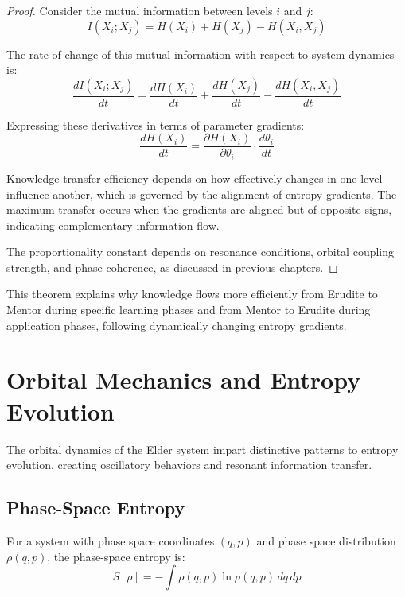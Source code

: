 \begin{proof}
Consider the mutual information between levels $i$ and $j$:
\begin{equation}
I(X_i; X_j) = H(X_i) + H(X_j) - H(X_i, X_j)
\end{equation}

The rate of change of this mutual information with respect to system dynamics is:
\begin{equation}
\frac{dI(X_i; X_j)}{dt} = \frac{dH(X_i)}{dt} + \frac{dH(X_j)}{dt} - \frac{dH(X_i, X_j)}{dt}
\end{equation}

Expressing these derivatives in terms of parameter gradients:
\begin{equation}
\frac{dH(X_i)}{dt} = \frac{\partial H(X_i)}{\partial \theta_i} \cdot \frac{d\theta_i}{dt}
\end{equation}

Knowledge transfer efficiency depends on how effectively changes in one level influence another, which is governed by the alignment of entropy gradients. The maximum transfer occurs when the gradients are aligned but of opposite signs, indicating complementary information flow.

The proportionality constant depends on resonance conditions, orbital coupling strength, and phase coherence, as discussed in previous chapters.
\end{proof}

This theorem explains why knowledge flows more efficiently from Erudite to Mentor during specific learning phases and from Mentor to Erudite during application phases, following dynamically changing entropy gradients.

\section{Orbital Mechanics and Entropy Evolution}

The orbital dynamics of the Elder system impart distinctive patterns to entropy evolution, creating oscillatory behaviors and resonant information transfer.

\subsection{Phase-Space Entropy}

\begin{definition}
For a system with phase space coordinates $(q, p)$ and phase space distribution $\rho(q, p)$, the phase-space entropy is:
\begin{equation}
S[\rho] = -\int \rho(q, p) \ln \rho(q, p) \, dq \, dp
\end{equation}
\end{definition}

